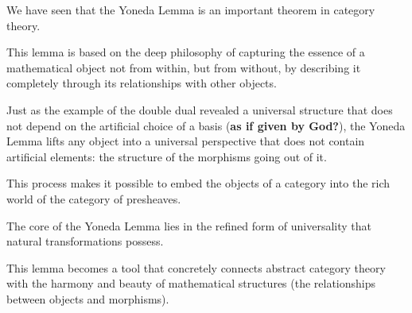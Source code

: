 \documentclass[uplatex,a4j,12pt,dvipdfmx]{jsarticle}
\begin{document}
We have seen that the Yoneda Lemma is an important theorem in category theory.

This lemma is based on the deep philosophy of capturing the essence of a mathematical object not from within, but from without, by describing it completely through its relationships with other objects.

	{}

Just as the example of the double dual revealed a universal structure that does not depend on the artificial choice of a basis (\textbf{as if given by God?}),
the Yoneda Lemma lifts any object into a universal perspective that does not contain artificial elements: the structure of the morphisms going out of it.


This process makes it possible to embed the objects of a category into the rich world of the category of presheaves.

	{}

The core of the Yoneda Lemma lies in the refined form of universality that natural transformations possess.

This lemma becomes a tool that concretely connects abstract category theory with the harmony and beauty of mathematical structures (the relationships between objects and morphisms).
\end{document}
